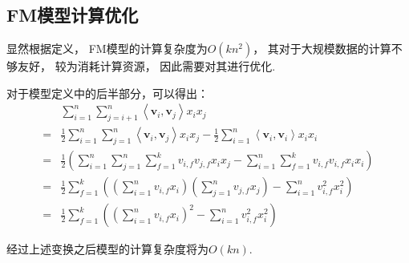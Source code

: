 \subsection{FM模型计算优化}

显然根据定义，
FM模型的计算复杂度为$O(kn^2)$，
其对于大规模数据的计算不够友好，
较为消耗计算资源，
因此需要对其进行优化.

对于模型定义中的后半部分，可以得出：
\begin{equation}
    \begin{aligned}
          & \sum_{i=1}^{n} \sum_{j=i+1}^{n}\left\langle\mathbf{v}_{i}, \mathbf{v}_{j}\right\rangle x_{i} x_{j}                                                                                                         \\
        = & \frac{1}{2} \sum_{i=1}^{n} \sum_{j=1}^{n}\left\langle\mathbf{v}_{i}, \mathbf{v}_{j}\right\rangle x_{i} x_{j}-\frac{1}{2} \sum_{i=1}^{n}\left\langle\mathbf{v}_{i}, \mathbf{v}_{i}\right\rangle x_{i} x_{i} \\
        = & \frac{1}{2}\left(\sum_{i=1}^{n} \sum_{j=1}^{n} \sum_{f=1}^{k} v_{i, f} v_{j, f} x_{i} x_{j}-\sum_{i=1}^{n} \sum_{f=1}^{k} v_{i, f} v_{i, f} x_{i} x_{i}\right)                                             \\
        = & \frac{1}{2} \sum_{f=1}^{k}\left(\left(\sum_{i=1}^{n} v_{i, f} x_{i}\right)\left(\sum_{j=1}^{n} v_{j, f} x_{j}\right)-\sum_{i=1}^{n} v_{i, f}^{2} x_{i}^{2}\right)                                          \\
        = & \frac{1}{2} \sum_{f=1}^{k}\left({\left(\sum_{i=1}^{n} v_{i, f} x_{i}\right)}^{2}- \sum_{i=1}^{n} v_{i, f}^{2} x_{i}^{2}\right)
    \end{aligned}
\end{equation}

经过上述变换之后模型的计算复杂度将为$O(kn)$.